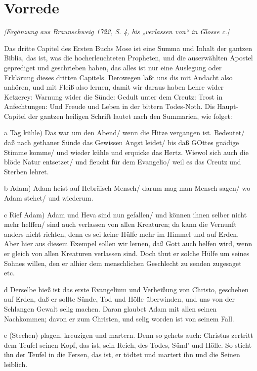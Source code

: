 \section{Vorrede}

\emph{[Ergänzung aus Braunschweig 1722, S. 4, bis „verlassen von“ in Glosse c.]}

Das dritte Capitel des Ersten Buchs Mose ist eine Summa und Inhalt der gantzen Biblia, das ist, was die hocherleuchteten Propheten, und die auserwählten Apostel geprediget und geschrieben haben, das alles ist nur eine Auslegung oder Erklärung dieses dritten Capitels. Derowegen laßt uns dis mit Andacht also anhören, und mit Fleiß also lernen, damit wir daraus haben Lehre wider Ketzerey: Warnung wider die Sünde: Gedult unter dem Creutz: Trost in Anfechtungen: Und Freude und Leben in der bittern Todes-Noth. Dis Haupt-Capitel der gantzen heiligen Schrift lautet nach den Summarien, wie folget:

a Tag kühle) Das war um den Abend/ wenn die Hitze vergangen ist. Bedeutet/ daß nach gethaner Sünde das Gewissen Angst leidet/ bis daß GOttes gnädige Stimme komme/ und wieder kühle und erquicke das Hertz. Wiewol sich auch die blöde Natur entsetzet/ und fleucht für dem Evangelio/ weil es das Creutz und Sterben lehret.

b Adam) Adam heist auf Hebräisch Mensch/ darum mag man Mensch sagen/ wo Adam stehet/ und wiederum.

c Rief Adam) Adam und Heva sind nun gefallen/ und können ihnen selber nicht mehr helffen/ sind auch verlassen von
allen Kreaturen; da kann die Vernunft anders nicht richten, denn es sei keine Hülfe mehr im Himmel und auf Erden. Aber hier aus diesem Exempel sollen wir lernen, daß Gott auch helfen wird, wenn er gleich von allen Kreaturen verlassen sind. Doch thut er solche Hülfe um seines Sohnes willen, den er alhier dem menschlichen Geschlecht zu senden zugesaget etc.

d Derselbe hieß ist das erste Evangelium und Verheißung von Christo, geschehen auf Erden, daß er sollte Sünde, Tod und Hölle überwinden, und uns von der Schlangen Gewalt selig machen. Daran glaubet Adam mit allen seinen Nachkommen; davon er zum Christen, und selig worden ist von seinem Fall.

e (Stechen) plagen, kreuzigen und martern. Denn so gehets auch: Christus zertritt dem Teufel seinen Kopf, das ist, sein Reich, des Todes, Sünd' und Hölle. So sticht ihn der Teufel in die Fersen, das ist, er tödtet und martert ihn und die Seinen leiblich.

